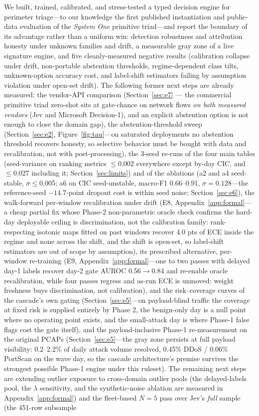 \documentclass[sigconf,anonymous=false]{acmart}
\begin{document}
We built, trained, calibrated, and stress-tested a typed decision engine for perimeter triage---to our knowledge the first published instantiation and public-data evaluation of the \emph{System One} primitive triad---and report the boundary of its advantage rather than a uniform win: detection robustness and attribution honesty under unknown families and drift, a measurable gray zone of a live signature engine, and five cleanly-measured negative results (calibration collapse under drift, non-portable abstention thresholds, regime-dependent class tilts, unknown-option accuracy cost, and label-shift estimators failing by assumption violation under open-set drift). The following former next steps are already measured: the vendor-API comparison (Section~\ref{sec:e7} --- the commercial primitive triad zero-shot sits at gate-chance on network flows \emph{on both measured vendors} (Jev and Microsoft Decision-1), and an explicit abstention option is not enough to close the domain gap), the abstention-threshold sweep (Section~\ref{sec:e2}, Figure~\ref{fig:tau}---on saturated deployments no abstention threshold recovers honesty, so selective behavior must be bought with data and recalibration, not with post-processing), the 3-seed re-runs of the four main tables (seed-variance on ranking metrics $\le$0.002 everywhere except by-day CIC, and $\le$0.027 including it; Section~\ref{sec:limits}) and of the ablations (a2 and a4 seed-stable, $\sigma\le$0.005; a6 on CIC seed-unstable, macro-F1 0.66--0.91, $\sigma{=}0.128$---the reference-seed $-14.7$-point dropout cost is within seed noise; Section~\ref{sec:e6}), the walk-forward per-window recalibration under drift (E8, Appendix~\ref{app:formal}---a cheap partial fix whose Phase-2 non-parametric oracle check confirms the hard-day deployable ceiling is discrimination, not the calibration family: rank-respecting isotonic maps fitted on past windows recover 4.0 pts of ECE inside the regime and none across the shift, and the shift is open-set, so label-shift estimators are out of scope by assumption), its prescribed alternative, per-window re-training (E9, Appendix~\ref{app:formal}---one to two passes with delayed day-1 labels recover day-2 gate AUROC 0.56$\to$0.84 and re-enable oracle recalibration, while four passes regress and as-run ECE is unmoved: weight freshness buys discrimination, not calibration), and the risk--coverage curves of the cascade's own gating (Section~\ref{sec:e5}---on payload-blind traffic the coverage at fixed risk is supplied entirely by Phase 2, the benign-only day is a null point where no operating point exists, and the small-attack day is where Phase-1 false flags cost the gate itself), and the payload-inclusive Phase-1 re-measurement on the original PCAPs (Section~\ref{sec:e5}---the gray zone persists at full payload visibility: 0.2--2.2\% of daily attack volume resolved, 0.45\% DDoS / 0.06\% PortScan on the wave day, so the cascade architecture's premise survives the strongest possible Phase-1 engine under this ruleset). The remaining next steps are extending outlier exposure to cross-domain outlier pools (the delayed-labels pool, the $\lambda$ sensitivity, and the synthetic-noise ablation are measured in Appendix~\ref{app:formal}) and the fleet-based $N{=}5$ pass over Jev's \emph{full} sample (the 451-row subsample 
\end{document}
